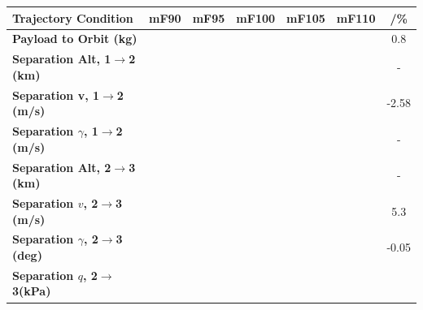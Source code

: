 \begin{table}[ht]
	\centering
\begin{tabular}{l c c c c c c} 
	\hline \textbf{Trajectory Condition}
	&mF90
	&mF95
	&mF100
	&mF105
	&mF110
	& /\%
	\\
	\hline \textbf{Payload to Orbit (kg)}
	& \PayloadToOrbitmFuelNinety
	& \PayloadToOrbitmFuelNinetyFive
	& \PayloadToOrbitmFuelStandard
	& \PayloadToOrbitmFuelOneHundredFive
	& \PayloadToOrbitmFuelOneHundredTen
	&0.8
	\\
	\textbf{Separation Alt, 1$\rightarrow$2 (km)}
	& \firstsecondSeparationAltmFuelNinety
	& \firstsecondSeparationAltmFuelNinetyFive
	& \firstsecondSeparationAltmFuelStandard
	& \firstsecondSeparationAltmFuelOneHundredFive
	& \firstsecondSeparationAltmFuelOneHundredTen
	& -
	\\
	\textbf{Separation v, 1$\rightarrow$2 (m/s)}
	& \firstsecondSeparationvmFuelNinety
	& \firstsecondSeparationvmFuelNinetyFive
	& \firstsecondSeparationvmFuelStandard
	& \firstsecondSeparationvmFuelOneHundredFive
	& \firstsecondSeparationvmFuelOneHundredTen
	&-2.58
	\\
	\textbf{Separation $\gamma$, 1$\rightarrow$2 (m/s)}
	& \firstsecondSeparationgammamFuelNinety
	& \firstsecondSeparationgammamFuelNinetyFive
	& \firstsecondSeparationgammamFuelStandard
	& \firstsecondSeparationgammamFuelOneHundredFive
	& \firstsecondSeparationgammamFuelOneHundredTen
	& -
	\\
	\textbf{Separation Alt, 2$\rightarrow$3 (km)}
	& \secondthirdSeparationAltmFuelNinety
	& \secondthirdSeparationAltmFuelNinetyFive
	& \secondthirdSeparationAltmFuelStandard
	& \secondthirdSeparationAltmFuelOneHundredFive
	& \secondthirdSeparationAltmFuelOneHundredTen
	& -
	\\
	\textbf{Separation $v$, 2$\rightarrow$3 (m/s)}
	& \secondthirdSeparationvmFuelNinety
	& \secondthirdSeparationvmFuelNinetyFive
	& \secondthirdSeparationvmFuelStandard
	& \secondthirdSeparationvmFuelOneHundredFive
	& \secondthirdSeparationvmFuelOneHundredTen
	&5.3
	\\
	\textbf{Separation $\gamma$, 2$\rightarrow$3 (deg)}
	& \secondthirdSeparationgammamFuelNinety
	& \secondthirdSeparationgammamFuelNinetyFive
	& \secondthirdSeparationgammamFuelStandard
	& \secondthirdSeparationgammamFuelOneHundredFive
	& \secondthirdSeparationgammamFuelOneHundredTen
	&-0.05
	\\
	\textbf{Separation $q$, 2$\rightarrow$3(kPa)}
	& \secondthirdSeparationqmFuelNinety
	& \secondthirdSeparationqmFuelNinetyFive
	& \secondthirdSeparationqmFuelStandard

\end{tabular}
\end{table}
